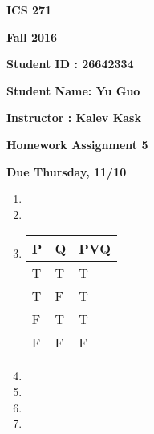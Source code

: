 \documentclass{article}
\begin{document}
{\bf ICS 271}

{\bf Fall 2016}

{\bf Student ID : 26642334}

{\bf Student Name: Yu Guo}

{\bf Instructor : Kalev Kask}

{\bf Homework Assignment 5}

{\bf Due Thursday, 11/10}




\begin{enumerate}

\item




\item





\item


\begin{table}[ht]
\centering
\begin{tabular}{|l|l|l|}
\hline
P & Q & PVQ \\ \hline
T & T & T   \\ \hline
T & F & T   \\ \hline
F & T & T   \\ \hline
F & F & F   \\ \hline
\end{tabular}
\end{table}


\item
 





\item






\item






\item







\end{enumerate}
\end{document}
